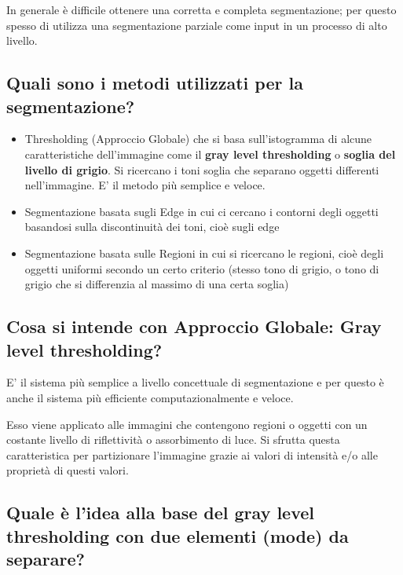 In generale è difficile ottenere una corretta e completa segmentazione; per questo spesso di utilizza una segmentazione parziale come input in un processo di alto livello.

\subsection{Quali sono i metodi utilizzati per la segmentazione?}
\begin{itemize}
\item Thresholding (Approccio Globale) che si basa sull'istogramma di alcune caratteristiche dell'immagine come il \textbf{gray level
thresholding} o \textbf{soglia del livello di grigio}. Si ricercano i toni soglia che separano oggetti differenti nell’immagine. E’ il metodo più semplice e veloce.
\item Segmentazione basata sugli Edge in cui ci cercano i contorni degli oggetti basandosi sulla discontinuità dei toni, cioè sugli edge
\item Segmentazione basata sulle Regioni in cui si ricercano le regioni, cioè degli oggetti uniformi secondo un certo criterio (stesso tono di grigio, o tono di grigio che si differenzia al massimo di una certa soglia)
\end{itemize}

\subsection{Cosa si intende con Approccio Globale: Gray level thresholding?}
E' il sistema più semplice a livello concettuale di segmentazione e per questo è anche il sistema più efficiente computazionalmente e veloce.

Esso viene applicato alle immagini che contengono regioni o oggetti con un costante livello di riflettività o assorbimento di luce. Si sfrutta questa caratteristica per partizionare l'immagine grazie ai valori di intensità e/o alle proprietà di questi valori.

\subsection{Quale è l'idea alla base del gray level thresholding con due elementi (mode) da separare?}

